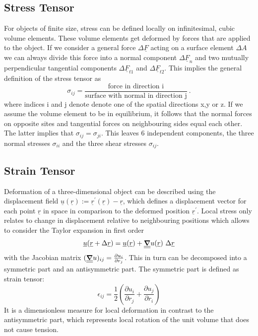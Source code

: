 \subsection{Stress Tensor}
For objects of finite size, stress can be defined locally on
infinitesimal, cubic volume elements. These volume elements get deformed by
forces that are applied to the object. If we consider a general force
$\Delta \underline{F}$ acting on a surface element $\Delta A$ we can always
divide
this force into a normal component $\Delta \underline{F}_n$ and two mutually
perpendicular tangential components $\Delta \underline{F}_{t1}$ and
$\Delta \underline{F}_{t2}$. This implies the general definition of the stress
tensor
as
\begin{equation}
    \sigma_{ij} = \frac{\text{force in direction i}}{\text{surface with normal
            in direction j}} \ .
\end{equation}
where indices i and j denote denote one of the spatial directions x,y or z.
If we assume the volume element to be in equilibrium, it follows that the
normal forces on opposite sites and tangential forces on neighbouring sides
equal each other.
The latter implies that $\sigma_{ij}=\sigma_{ji}$. This leaves 6
independent components, the three normal stresses $\sigma_{ii}$ and the three
shear stresses $\sigma_{ij}$.

\subsection{Strain Tensor}
Deformation of a three-dimensional object can be described using the
displacement field $\underline{u}(\underline{r}):=
    \underline{r}^\prime(\underline{r})-\underline{r}$,
which defines a displacement vector for each point $\underline{r}$ in space in
comparison to the deformed position $\underline{r}^\prime$. Local stress only
relates to change in displacement relative to neighbouring positions which
allows to consider the Taylor expansion in first order
\begin{equation}
    \underline{u}(\underline{r}+\Delta\underline{r})
    = \underline{u}(\underline{r}) +
    \underline{\underline{\gradient}}u(\underline{r})\ \Delta \underline{r}
\end{equation}
with the Jacobian matrix $(\underline{\underline{\gradient}}u )_{ij} =
    \frac{\partial u_i}{\partial r_j}$. This in turn can be decomposed into a
symmetric part and an antisymmetric part. The symmetric part is defined as
strain tensor:
\begin{equation} \label{eq:defstrain}
    \epsilon_{ij} = \frac{1}{2} \left(	 \frac{\partial u_i}{\partial r_j}
    +\frac{\partial u_j}{\partial r_i} \right)
\end{equation}
It is a dimensionless measure for local deformation in contrast to the
antisymmetric part, which represents local rotation of the unit volume that
does not cause tension.


